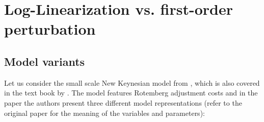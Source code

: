 \section{Log-Linearization vs. first-order perturbation\label{ex:LogLinearization}}

\subsection*{Model variants}
Let us consider the small scale New Keynesian model from \textcite{An.Schorfheide_2007_BayesianAnalysisDSGE},
  which is also covered in the text book by \textcite{Herbst.Schorfheide_2016_BayesianEstimationDSGE}.
The model features Rotemberg adjustment costs and in the paper the authors present three different model representations
  (refer to the original paper for the meaning of the variables and parameters):

